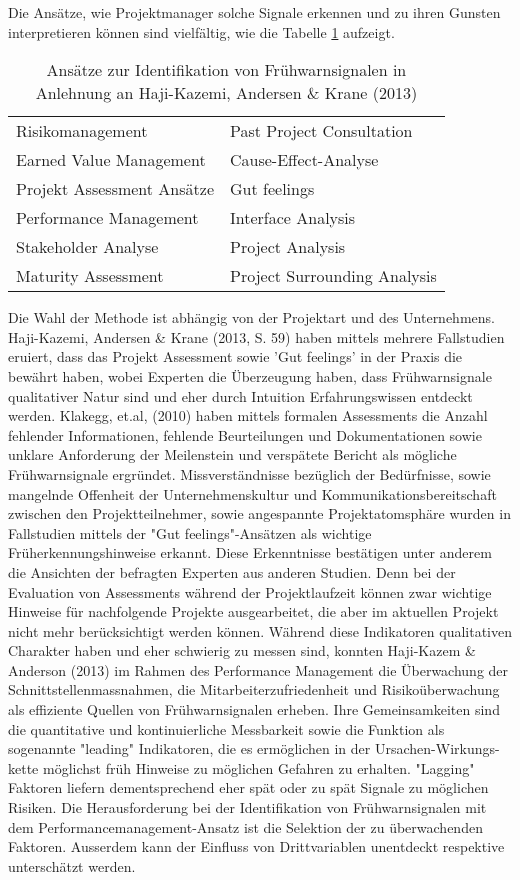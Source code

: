 \newline
Die Ansätze, wie Projektmanager solche Signale erkennen und zu ihren Gunsten interpretieren können sind vielfältig, wie die Tabelle \ref{tab:Ans} aufzeigt.
\begin{table}[H]
	\centering
	\caption{Ansätze zur Identifikation von Frühwarnsignalen
		\newline in Anlehnung an Haji-Kazemi, Andersen \& Krane (2013)}\label{tab:Ans}	
	\begin{tabular}{l|l}
		Risikomanagement & Past Project Consultation\\
		Earned Value Management & Cause-Effect-Analyse\\
		Projekt Assessment Ansätze & Gut feelings \\
		Performance Management & Interface Analysis\\
		Stakeholder Analyse & Project Analysis \\
		Maturity Assessment & Project Surrounding Analysis\\
	\end{tabular}		
\end{table}
Die Wahl der Methode ist abhängig von der Projektart und des Unternehmens. Haji-Kazemi, Andersen \& Krane (2013, S. 59) haben mittels mehrere Fallstudien eruiert, dass das Projekt Assessment sowie 'Gut feelings' in der Praxis die bewährt haben, wobei Experten die Überzeugung haben, dass Frühwarnsignale qualitativer Natur sind und eher durch Intuition Erfahrungswissen entdeckt werden. Klakegg, et.al, (2010) haben mittels formalen Assessments die Anzahl fehlender Informationen, fehlende Beurteilungen und Dokumentationen sowie unklare Anforderung der Meilenstein und verspätete Bericht als mögliche Frühwarnsignale ergründet. Missverständnisse bezüglich der Bedürfnisse, sowie mangelnde Offenheit der Unternehmenskultur und Kommunikationsbereitschaft zwischen den Projektteilnehmer, sowie angespannte Projektatomsphäre wurden in Fallstudien mittels der "Gut feelings"-Ansätzen als wichtige Früherkennungshinweise erkannt. Diese Erkenntnisse bestätigen unter anderem die Ansichten der befragten Experten aus anderen Studien. Denn bei der Evaluation von Assessments während der Projektlaufzeit können zwar wichtige Hinweise für nachfolgende Projekte ausgearbeitet, die aber im aktuellen Projekt nicht mehr berücksichtigt werden können. Während diese Indikatoren qualitativen Charakter haben und eher schwierig zu messen sind, konnten Haji-Kazem \& Anderson (2013) im Rahmen des Performance Management die Überwachung der Schnittstellenmassnahmen, die Mitarbeiterzufriedenheit und Risikoüberwachung als effiziente Quellen von Frühwarnsignalen erheben. Ihre Gemeinsamkeiten sind die quantitative und kontinuierliche Messbarkeit sowie die Funktion als sogenannte "leading" Indikatoren, die es ermöglichen in der Ursachen-Wirkungs-kette möglichst früh Hinweise zu möglichen Gefahren zu erhalten. "Lagging" Faktoren liefern dementsprechend eher spät oder zu spät Signale zu möglichen Risiken. Die Herausforderung bei der Identifikation von Frühwarnsignalen mit dem Performancemanagement-Ansatz ist die Selektion der zu überwachenden Faktoren. Ausserdem kann der Einfluss von Drittvariablen unentdeckt respektive unterschätzt werden.
